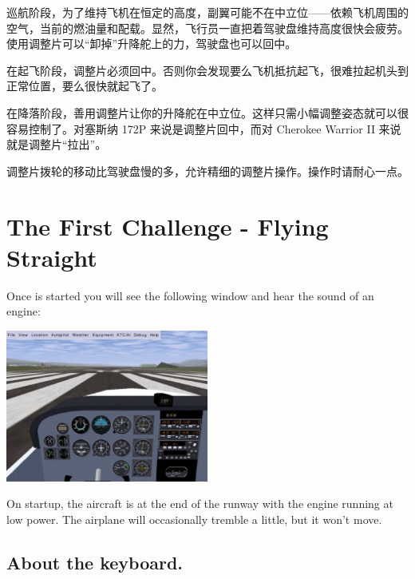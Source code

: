 巡航阶段，为了维持飞机在恒定的高度，副翼可能不在中立位——依赖飞机周围的空气，当前的燃油量和配载。显然，飞行员一直把着驾驶盘维持高度很快会疲劳。使用调整片可以“卸掉”升降舵上的力，驾驶盘也可以回中。

在起飞阶段，调整片必须回中。否则你会发现要么飞机抵抗起飞，很难拉起机头到正常位置，要么很快就起飞了。

在降落阶段，善用调整片让你的升降舵在中立位。这样只需小幅调整姿态就可以很容易控制了。对塞斯纳 172P 来说是调整片回中，而对 Cherokee Warrior II 来说就是调整片“拉出”。

调整片拨轮的移动比驾驶盘慢的多，允许精细的调整片操作。操作时请耐心一点。


\iffalse
\section{The First Challenge - Flying Straight}
\label{sec:FlyingStraight}

Once \FlightGear{} is started you will see the following window and hear the
sound of an engine:

\begin{center}
\includegraphics[width=0.5\textwidth]{img/tut_6}
\end{center}

On startup, the aircraft is at the end of the runway with the engine running
at low power. The airplane will occasionally tremble a little, but it won't
move.

\subsection*{About the keyboard.}


